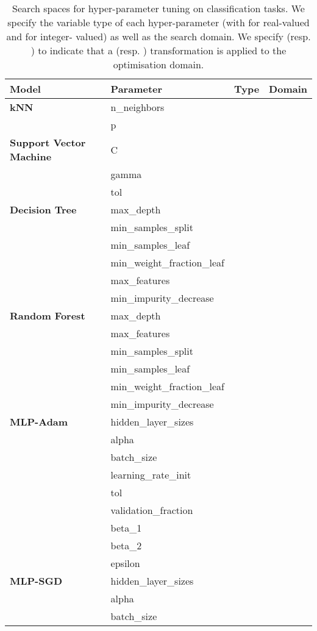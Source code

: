 \documentclass[jair,twoside,11pt,theapa]{article}
\theoremstyle{definition}
\begin{document}
\begin{table}[t!]
\centering
\caption{Search spaces for hyper-parameter tuning on classification tasks. We specify the variable type of each hyper-parameter (with  for real-valued and  for integer- valued) as well as the search domain. We specify  (resp. ) to indicate that a  (resp. ) transformation is applied to the optimisation domain.}
\label{tab:search-space}
\begin{tabular}{llcl}
\toprule
Model & Parameter  &  Type &  Domain \\
\midrule
\textbf{kNN} &  n\_neighbors &  &  \\ 
\ & p &  &  \\ 
\textbf{Support Vector Machine} &  C &  &  \\ 
\ & gamma &  &  \\ 
\ & tol &  &  \\ 
\textbf{Decision Tree} &  max\_depth &  &  \\ 
\ & min\_samples\_split &  &  \\ 
\ & min\_samples\_leaf &  &  \\ 
\ & min\_weight\_fraction\_leaf &  &  \\ 
\ & max\_features &  &  \\ 
\ & min\_impurity\_decrease &  &  \\ 
\textbf{Random Forest} &  max\_depth &  &  \\ 
\ & max\_features &  &  \\ 
\ & min\_samples\_split &  &  \\ 
\ & min\_samples\_leaf &  &  \\ 
\ & min\_weight\_fraction\_leaf &  &  \\ 
\ & min\_impurity\_decrease &  &  \\ 
\textbf{MLP-Adam} &  hidden\_layer\_sizes &  &  \\ 
\ & alpha &  &  \\ 
\ & batch\_size &  &  \\ 
\ & learning\_rate\_init &  &  \\ 
\ & tol &  &  \\ 
\ & validation\_fraction &  &  \\ 
\ & beta\_1 &  &  \\ 
\ & beta\_2 &  &  \\ 
\ & epsilon &  &  \\ 
\textbf{MLP-SGD} &  hidden\_layer\_sizes &  &  \\ 
\ & alpha &  &  \\ 
\ & batch\_size &  &  \\ 

\end{tabular}
\end{table}
\end{document}
